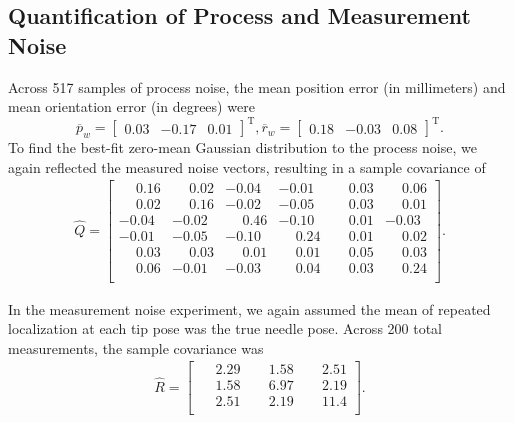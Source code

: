 \subsection{Quantification of Process and Measurement Noise}
Across 517 samples of process noise, the mean position error (in millimeters) and mean orientation error (in degrees) were \[{\overline{p}_{w}} = \begin{bmatrix} 0.03 &-0.17 &0.01 \end{bmatrix}^{\text{T}}, {\overline{r}_{w}} = \begin{bmatrix} 0.18 &-0.03 &0.08 \end{bmatrix}^{\text{T}}.\] To find the best-fit zero-mean Gaussian distribution to the process noise, we again reflected the measured noise vectors, resulting in a sample covariance of
\begin{align*}
{\hat{Q}} = \begin{bmatrix} 
\phantom{-}0.16 & \phantom{-}0.02 	&-0.04 & -0.01 & \phantom{-}0.03 & \phantom{-}0.06\\
\phantom{-}0.02 & \phantom{-}0.16 & -0.02 & -0.05 & \phantom{-}0.03 & \phantom{-}0.01 \\ 
-0.04 & -0.02 & \phantom{-}0.46 & -0.10 & \phantom{-}0.01 & -0.03 \\
-0.01 & -0.05 & -0.10 & \phantom{-}0.24 & \phantom{-}0.01 & \phantom{-}0.02 \\
\phantom{-}0.03 & \phantom{-}0.03 & \phantom{-}0.01 & \phantom{-}0.01 & \phantom{-}0.05 & \phantom{-}0.03 \\
\phantom{-}0.06 & -0.01 & -0.03 & \phantom{-}0.04 & \phantom{-}0.03 & \phantom{-}0.24\\ 
\end{bmatrix}.
\end{align*}

In the measurement noise experiment, we again assumed the mean of repeated localization at each tip pose was the true needle pose. Across 200 total measurements, the sample covariance was 
\begin{align*}
{\hat{R}} = \begin{bmatrix} 
\phantom{-}2.29 & \phantom{-}1.58 & \phantom{-}2.51 \\ 
\phantom{-}1.58 & \phantom{-}6.97 & \phantom{-}2.19 \\ 
\phantom{-}2.51 & \phantom{-}2.19 & \phantom{-}11.4 \\ 
\end{bmatrix}.
\end{align*}

